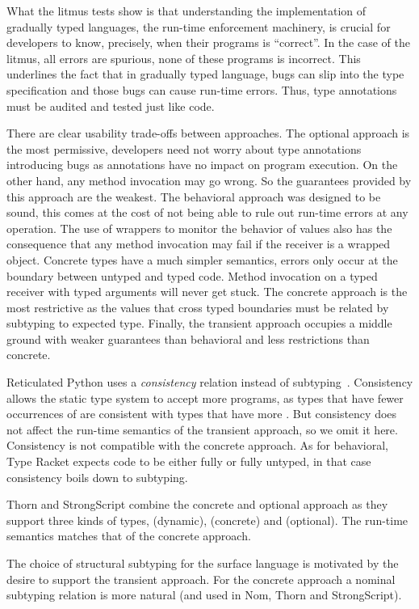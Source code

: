 \documentclass[USenglish]{tex/lipics-v2016}
\begin{document}
What the litmus tests show is that understanding the implementation of
gradually typed languages, the run-time enforcement machinery, is crucial
for developers to know, precisely, when their programs is ``correct''.  In
the case of the litmus, all errors are spurious, none of these programs is
incorrect. This underlines the fact that in gradually typed language, bugs
can slip into the type specification and those bugs can cause run-time
errors. Thus, type annotations must be audited and tested just like code.

There are clear usability trade-offs between approaches. The optional
approach is the most permissive, developers need not worry about type
annotations introducing bugs as annotations have no impact on program
execution. On the other hand, any method invocation may go wrong. So the
guarantees provided by this approach are the weakest. The behavioral
approach was designed to be sound, this comes at the cost of not being able
to rule out run-time errors at any operation. The use of wrappers to monitor
the behavior of values also has the consequence that any method invocation
may fail if the receiver is a wrapped object.  Concrete types have a much
simpler semantics, errors only occur at the boundary between untyped and
typed code. Method invocation on a typed receiver with typed arguments will
never get stuck. The concrete approach is the most restrictive as the values
that cross typed boundaries must be related by subtyping to expected type.
Finally, the transient approach occupies a middle ground with weaker
guarantees than behavioral and less restrictions than concrete.

Reticulated Python uses a \emph{consistency} relation instead of
subtyping~\cite{siek14}.  Consistency allows the static type system to
accept more programs, as types that have fewer occurrences of \any are
consistent with types that have more \any. But consistency does not affect
the run-time semantics of the transient approach, so we omit it
here. Consistency is not compatible with the concrete approach. As for
behavioral, Type Racket expects code to be either fully or fully untyped, in
that case consistency boils down to subtyping.

Thorn and StrongScript combine the concrete and optional approach as they
support three kinds of types, \any (dynamic), \C (concrete) and  \C
(optional). The run-time semantics matches that of the concrete approach.

The choice of structural subtyping for the surface language is motivated by
the desire to support the transient approach. For the concrete approach a
nominal subtyping relation is more natural (and used in Nom, Thorn and
StrongScript).
\end{document}

